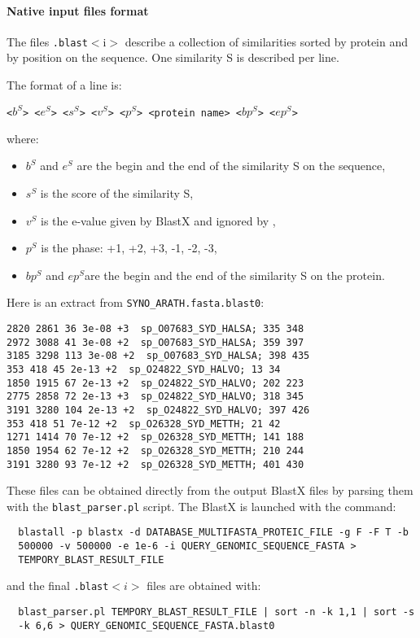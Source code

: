 \paragraph{Native input files format}

The files \texttt{.blast}$<$i$>$ describe a collection of similarities
sorted by protein and by position on the sequence. One similarity S is
described per line.

The format of a line is:

\texttt{<$b^S$> <$e^S$> <$s^S$> <$v^S$> <$p^S$> <protein name> <$bp^S$> <$ep^S$>}

where:
\begin{itemize}
\item $b^S$ and $e^S$ are the begin and the end of the similarity S on the sequence,
\item $s^S$ is the score of the similarity S,
\item $v^S$ is the e-value given by BlastX and ignored by \EuGene,
\item $p^S$ is the phase: +1, +2, +3, -1, -2, -3,
\item $bp^S$ and $ep^S$are the begin and the end of the similarity S on the protein.
\end{itemize}

Here is an extract from \texttt{SYNO\_ARATH.fasta.blast0}:
\begin{Verbatim}[fontsize=\small]
2820 2861 36 3e-08 +3  sp_O07683_SYD_HALSA; 335 348
2972 3088 41 3e-08 +2  sp_O07683_SYD_HALSA; 359 397
3185 3298 113 3e-08 +2  sp_O07683_SYD_HALSA; 398 435
353 418 45 2e-13 +2  sp_O24822_SYD_HALVO; 13 34
1850 1915 67 2e-13 +2  sp_O24822_SYD_HALVO; 202 223
2775 2858 72 2e-13 +3  sp_O24822_SYD_HALVO; 318 345
3191 3280 104 2e-13 +2  sp_O24822_SYD_HALVO; 397 426
353 418 51 7e-12 +2  sp_O26328_SYD_METTH; 21 42
1271 1414 70 7e-12 +2  sp_O26328_SYD_METTH; 141 188
1850 1954 62 7e-12 +2  sp_O26328_SYD_METTH; 210 244
3191 3280 93 7e-12 +2  sp_O26328_SYD_METTH; 401 430
\end{Verbatim}
These files can be obtained directly from the output BlastX files by
parsing them with the \texttt{blast\_parser.pl} script.
The BlastX is launched with the command:
\begin{Verbatim}
  blastall -p blastx -d DATABASE_MULTIFASTA_PROTEIC_FILE -g F -F T -b
  500000 -v 500000 -e 1e-6 -i QUERY_GENOMIC_SEQUENCE_FASTA >
  TEMPORY_BLAST_RESULT_FILE
\end{Verbatim}
and the final \texttt{.blast}$<i>$ files are obtained with:
\begin{Verbatim}
  blast_parser.pl TEMPORY_BLAST_RESULT_FILE | sort -n -k 1,1 | sort -s
  -k 6,6 > QUERY_GENOMIC_SEQUENCE_FASTA.blast0
\end{Verbatim}

